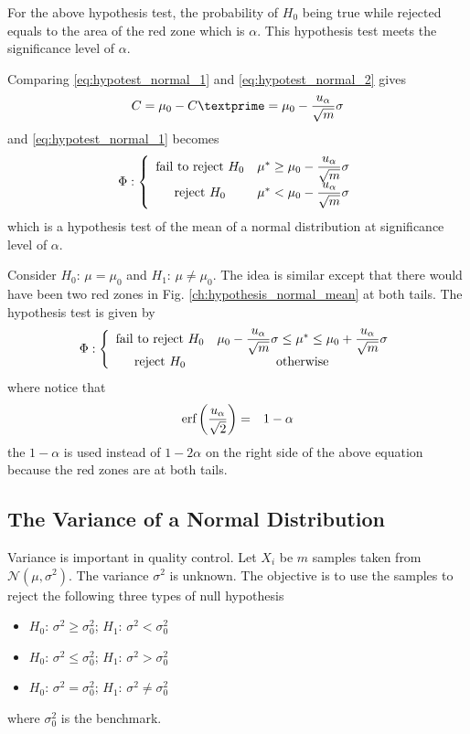 For the above hypothesis test, the probability of $H_0$ being true while rejected equals to the area of the red zone which is $\alpha$. This hypothesis test meets the significance level of $\alpha$. 

Comparing \eqref{eq:hypotest_normal_1} and \eqref{eq:hypotest_normal_2} gives
\begin{eqnarray}
	C = \mu_0 - C\textprime = \mu_0 - \dfrac{u_\alpha}{\sqrt{m}}\sigma \nonumber
\end{eqnarray}
and \eqref{eq:hypotest_normal_1} becomes
\begin{eqnarray}
	\Phi : \left\{\begin{array}{cc}
		\textup{fail to reject~} H_0 & \mu^* \geq \mu_0 - \dfrac{u_\alpha}{\sqrt{m}}\sigma \\
		\textup{reject~} H_0 & \mu^* < \mu_0 - \dfrac{u_\alpha}{\sqrt{m}}\sigma
	\end{array}\right. \nonumber
\end{eqnarray}
which is a hypothesis test of the mean of a normal distribution at significance level of $\alpha$.

Consider $H_0$: $\mu = \mu_0$ and  $H_1$: $\mu \neq \mu_0$. The idea is similar except that there would have been two red zones in Fig. \ref{ch:hypothesis_normal_mean} at both tails. The hypothesis test is given by
\begin{eqnarray}
	\Phi : \left\{\begin{array}{cc}
		\textup{fail to reject~} H_0 & \mu_0 - \dfrac{u_\alpha}{\sqrt{m}}\sigma \leq \mu^* \leq  \mu_0 + \dfrac{u_\alpha}{\sqrt{m}}\sigma \\
		\textup{reject~} H_0 & \textup{otherwise}
	\end{array}\right. \nonumber
\end{eqnarray}
where notice that 
\begin{eqnarray}
	\textup{erf}\left(\dfrac{u_\alpha}{\sqrt{2}}\right) &=& 1-\alpha \nonumber
\end{eqnarray}
the $1-\alpha$ is used instead of $1-2\alpha$ on the right side of the above equation because the red zones are at both tails.

\subsection{The Variance of a Normal Distribution}

Variance is important in quality control. Let $X_i$ be $m$ samples taken from $\mathcal{N}(\mu, \sigma^2)$. The variance $\sigma^2$ is unknown. The objective is to use the samples to reject the following three types of null hypothesis
\begin{itemize}
	\item $H_0$: $\sigma^2 \geq \sigma_0^2$; $H_1$: $\sigma^2 < \sigma_0^2$
	\item $H_0$: $\sigma^2 \leq \sigma_0^2$; $H_1$: $\sigma^2 > \sigma_0^2$
	\item $H_0$: $\sigma^2 = \sigma_0^2$; $H_1$: $\sigma^2 \neq \sigma_0^2$
\end{itemize}
where $\sigma_0^2$ is the benchmark.

